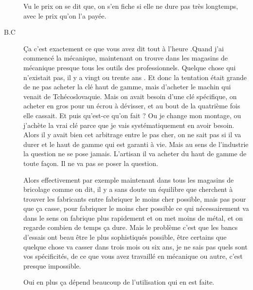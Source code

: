 \begin{description}
\vspace{1\baselineskip}

Vu le prix on se dit que, on s'en fiche si elle ne dure pas très longtemps, avec le prix qu'on l'a payée.

\vspace{1\baselineskip}

\item[B.C]Ça c'est exactement ce que vous avez dit tout à l'heure .Quand j'ai commencé la mécanique, maintenant on trouve dans les magasins de mécanique presque tous les outils des professionnels. Quelque chose qui n'existait pas, il y a vingt ou trente ans . Et donc la tentation était grande de ne pas acheter la clé haut de gamme, mais d'acheter le machin qui venait de Tchécoslovaquie. Mais on avait besoin d'une clé spécifique, on acheter en gros pour un écrou à dévisser, et au bout de la quatrième fois elle cassait. Et puis qu'est-ce qu'on fait ? Ou je change mon montage, ou j'achète la vrai clé parce que je vais systématiquement en avoir besoin. Alors il y avait bien cet arbitrage entre le pas cher, on ne sait pas si il va durer et le haut de gamme qui est garanti à vie. Mais au sens de l'industrie la question ne se pose jamais. L'artisan il va acheter du haut de gamme de toute façon. Il ne va pas se poser la question. 

Alors effectivement par exemple maintenant dans tous les magasins de bricolage comme on dit, il y a sans doute un équilibre que cherchent à trouver les fabricants entre fabriquer le moins cher possible, mais pas pour que ça casse, pour fabriquer le moins cher possible ce qui nécessairement va dans le sens on fabrique plus rapidement et on met moins de métal, et on regarde combien de temps ça dure. Mais le problème c'est que les bancs d'essais ont beau être le plus sophistiqués possible, être certains que quelque chose va casser dans trois mois ou six ans, je ne sais pas quels sont vos spécificités, de ce que vous avez travaillé en mécanique ou autre, c'est presque impossible.

\vspace{1\baselineskip}

Oui en plus ça dépend beaucoup de l'utilisation qui en est faite.

\vspace{1\baselineskip}


\end{description}
